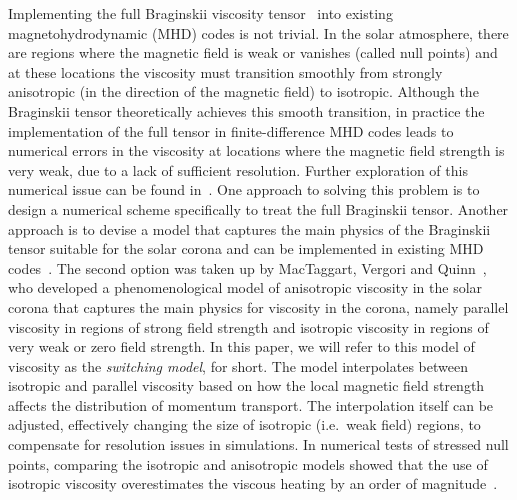 Implementing the full Braginskii viscosity
tensor~\cite{braginskiiTransportProcessesPlasma1965} into existing
magnetohydrodynamic (MHD) codes is not trivial. In the solar
atmosphere, there are regions where the magnetic field is weak or
vanishes (called null points) and at these locations the viscosity must
transition smoothly from strongly anisotropic (in the direction of the
magnetic field) to isotropic. Although the Braginskii tensor theoretically achieves
this smooth transition, in practice the implementation
of the full tensor in finite-difference MHD codes leads to numerical
errors in the viscosity at locations where the magnetic field strength
is very weak, due to a lack of sufficient resolution. Further
exploration of this numerical issue can be found
in~\cite{mactaggartBraginskiiMagnetohydrodynamicsArbitrary2017}. One
approach to solving this problem is to design a numerical scheme
specifically to treat the full Braginskii tensor. Another approach is
to devise a model that captures the main physics of the Braginskii
tensor suitable for the solar corona and can be implemented in
existing MHD codes~\cite{hollwegViscosityMagnetizedPlasma1985}. The
second option was taken up by MacTaggart, Vergori and
Quinn~\cite{mactaggartBraginskiiMagnetohydrodynamicsArbitrary2017},
who developed a phenomenological model of anisotropic viscosity in the
solar corona that captures the main physics for viscosity in the
corona, namely parallel viscosity in regions of strong field strength and isotropic viscosity in regions of very weak or zero field strength. In this paper, we will refer to this model of viscosity as the \textit{switching model}, for short. The model interpolates between isotropic and parallel viscosity based on how the local magnetic field strength affects the distribution of momentum transport. The interpolation itself can be adjusted, effectively changing the size of isotropic (i.e.\ weak field) regions, to compensate for resolution issues in simulations. In numerical tests of stressed null points, comparing the isotropic and anisotropic models showed that the use of isotropic viscosity overestimates the viscous heating by an order of magnitude~\cite{mactaggartBraginskiiMagnetohydrodynamicsArbitrary2017}.

